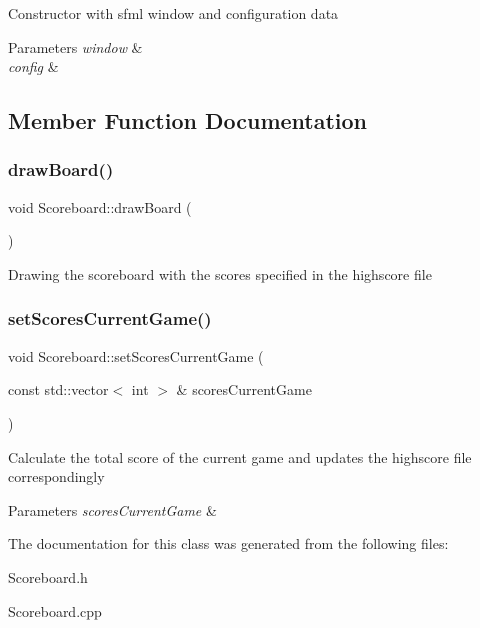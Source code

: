 Constructor with sfml window and configuration data 
\begin{DoxyParams}{Parameters}
{\em window} & \\
\hline
{\em config} & \\
\hline
\end{DoxyParams}


\subsection{Member Function Documentation}
\mbox{\label{classScoreboard_ae12729e1ea694e1ec2d8651a10c582b1}} 
\subsubsection{\texorpdfstring{draw\+Board()}{drawBoard()}}
{\footnotesize\ttfamily void Scoreboard\+::draw\+Board (\begin{DoxyParamCaption}{ }\end{DoxyParamCaption})}

Drawing the scoreboard with the scores specified in the highscore file \mbox{\label{classScoreboard_aa968340a9217f6ccd2ef4da7e43303b5}} 
\subsubsection{\texorpdfstring{set\+Scores\+Current\+Game()}{setScoresCurrentGame()}}
{\footnotesize\ttfamily void Scoreboard\+::set\+Scores\+Current\+Game (\begin{DoxyParamCaption}\item[{const std\+::vector$<$ int $>$ \&}]{scores\+Current\+Game }\end{DoxyParamCaption})}

Calculate the total score of the current game and updates the highscore file correspondingly 
\begin{DoxyParams}{Parameters}
{\em scores\+Current\+Game} & \\
\hline
\end{DoxyParams}


The documentation for this class was generated from the following files\+:\begin{DoxyCompactItemize}
\item 
Scoreboard.\+h\item 
Scoreboard.\+cpp\end{DoxyCompactItemize}
